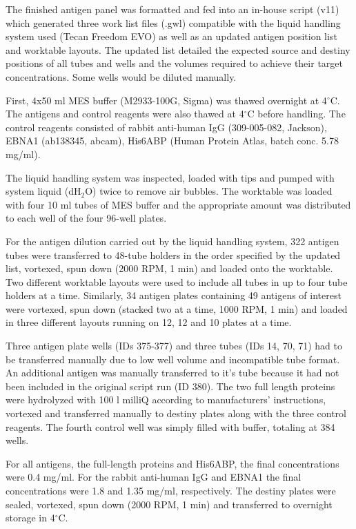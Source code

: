 \documentclass{article}
\begin{document}
The finished antigen panel was formatted and fed into an in-house script (v11) which generated three work list files (.gwl) compatible with the liquid handling system used (Tecan Freedom EVO) as well as an updated antigen position list and worktable layouts. The updated list detailed the expected source and destiny positions of all tubes and wells and the volumes required to achieve their target concentrations. Some wells would be diluted manually.

First, 4x50 ml MES buffer (M2933-100G, Sigma) was thawed overnight at 4$^{\circ}$C. The antigens and control reagents were also thawed at 4$^{\circ}$C before handling. The control reagents consisted of rabbit anti-human IgG (309-005-082, Jackson), EBNA1 (ab138345, abcam), His6ABP (Human Protein Atlas, batch conc. 5.78 mg/ml).

The liquid handling system was inspected, loaded with tips and pumped with system liquid (dH$_2$O) twice to remove air bubbles. The worktable was loaded with four 10 ml tubes of MES buffer and the appropriate amount was distributed to each well of the four 96-well plates.

For the antigen dilution carried out by the liquid handling system, 322 antigen tubes were transferred to 48-tube holders in the order specified by the updated list, vortexed, spun down (2000 RPM, 1 min) and loaded onto the worktable. Two different worktable layouts were used to include all tubes in up to four tube holders at a time. Similarly, 34 antigen plates containing 49 antigens of interest were vortexed, spun down (stacked two at a time, 1000 RPM, 1 min) and loaded in three different layouts running on 12, 12 and 10 plates at a time.

Three antigen plate wells (IDs 375-377) and three tubes (IDs 14, 70, 71) had to be transferred manually due to low well volume and incompatible tube format. An additional antigen was manually transferred to it's tube because it had not been included in the original script run (ID 380). The two full length proteins were hydrolyzed with 100 \textmu l milliQ according to manufacturers' instructions, vortexed and transferred manually to destiny plates along with the three control reagents. The fourth control well was simply filled with buffer, totaling at 384 wells.

For all antigens, the full-length proteins and His6ABP, the final concentrations were 0.4 mg/ml. For the rabbit anti-human IgG and EBNA1 the final concentrations were 1.8 and 1.35 mg/ml, respectively. The destiny plates were sealed, vortexed, spun down (2000 RPM, 1 min) and transferred to overnight storage in 4$^{\circ}$C.
\end{document}
